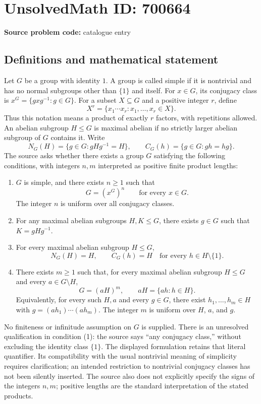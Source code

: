 \documentclass[11pt]{article}
\begin{document}
\section*{UnsolvedMath ID: 700664}
\textbf{Source problem code:} catalogue entry
\subsection{Definitions and mathematical statement}
Let \(G\) be a group with identity \(1\). A group is called simple if it is nontrivial and has no normal subgroups other than \(\{1\}\) and itself. For \(x\in G\), its conjugacy class is \(x^G=\{gxg^{-1}:g\in G\}\). For a subset \(X\subseteq G\) and a positive integer \(r\), define
\[
X^r=\{x_1\cdots x_r:x_1,\ldots,x_r\in X\}.
\]
Thus this notation means a product of exactly \(r\) factors, with repetitions allowed. An abelian subgroup \(H\leq G\) is maximal abelian if no strictly larger abelian subgroup of \(G\) contains it. Write
\[
N_G(H)=\{g\in G:gHg^{-1}=H\},\qquad C_G(h)=\{g\in G:gh=hg\}.
\]
The source asks whether there exists a group \(G\) satisfying the following conditions, with integers \(n,m\) interpreted as positive finite product lengths:
\begin{enumerate}
\item \(G\) is simple, and there exists \(n\geq 1\) such that
\[
G=(x^G)^n\qquad\text{for every }x\in G.
\]
The integer \(n\) is uniform over all conjugacy classes.
\item For any maximal abelian subgroups \(H,K\leq G\), there exists \(g\in G\) such that \(K=gHg^{-1}\).
\item For every maximal abelian subgroup \(H\leq G\),
\[
N_G(H)=H,\qquad C_G(h)=H\quad\text{for every }h\in H\setminus\{1\}.
\]
\item There exists \(m\geq 1\) such that, for every maximal abelian subgroup \(H\leq G\) and every \(a\in G\setminus H\),
\[
G=(aH)^m,
\qquad aH=\{ah:h\in H\}.
\]
Equivalently, for every such \(H,a\) and every \(g\in G\), there exist \(h_1,\ldots,h_m\in H\) with \(g=(ah_1)\cdots(ah_m)\). The integer \(m\) is uniform over \(H\), \(a\), and \(g\).
\end{enumerate}
No finiteness or infinitude assumption on \(G\) is supplied. There is an unresolved qualification in condition (1): the source says ``any conjugacy class,'' without excluding the identity class \(\{1\}\). The displayed formulation retains that literal quantifier. Its compatibility with the usual nontrivial meaning of simplicity requires clarification; an intended restriction to nontrivial conjugacy classes has not been silently inserted. The source also does not explicitly specify the signs of the integers \(n,m\); positive lengths are the standard interpretation of the stated products.
\end{document}

